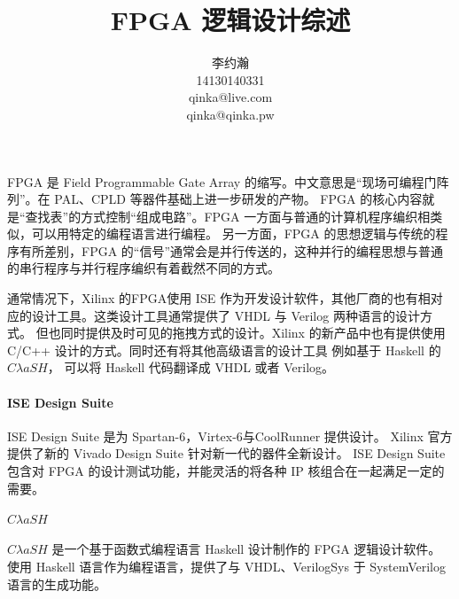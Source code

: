 \documentclass{ctexart}
\title{FPGA 逻辑设计综述}
\author{李约瀚 \\ 14130140331 \\ qinka@live.com \\ qinka@qinka.pw}
\begin{document}
\maketitle


FPGA 是 Field Programmable Gate Array 的缩写。中文意思是“现场可编程门阵列”。在 PAL、CPLD 等器件基础上进一步研发的产物。
FPGA 的核心内容就是“查找表”的方式控制“组成电路”。FPGA 一方面与普通的计算机程序编织相类似，可以用特定的编程语言进行编程。
另一方面，FPGA 的思想逻辑与传统的程序有所差别，FPGA 的“信号”通常会是并行传送的，这种并行的编程思想与普通的串行程序与并行程序编织有着截然不同的方式。

通常情况下，Xilinx 的FPGA使用 ISE 作为开发设计软件，其他厂商的也有相对应的设计工具。这类设计工具通常提供了 VHDL 与 Verilog 两种语言的设计方式。
但也同时提供及时可见的拖拽方式的设计。Xilinx 的新产品中也有提供使用 C/C++ 设计的方式。同时还有将其他高级语言的设计工具 例如基于 Haskell 的 $C\lambda aSH$，
可以将 Haskell 代码翻译成 VHDL 或者 Verilog。

\paragraph{ISE Design Suite}

ISE Design Suite 是为 Spartan-6，Virtex-6与CoolRunner 提供设计。 Xilinx 官方提供了新的 Vivado Design Suite 针对新一代的器件全新设计。
ISE Design Suite 包含对 FPGA 的设计测试功能，并能灵活的将各种 IP 核组合在一起满足一定的需要。

\paragraph{$C\lambda aSH$}
$C\lambda aSH$ 是一个基于函数式编程语言 Haskell 设计制作的 FPGA 逻辑设计软件。
使用 Haskell 语言作为编程语言，提供了与 VHDL、VerilogSys 于 SystemVerilog 语言的生成功能。
\end{document}
